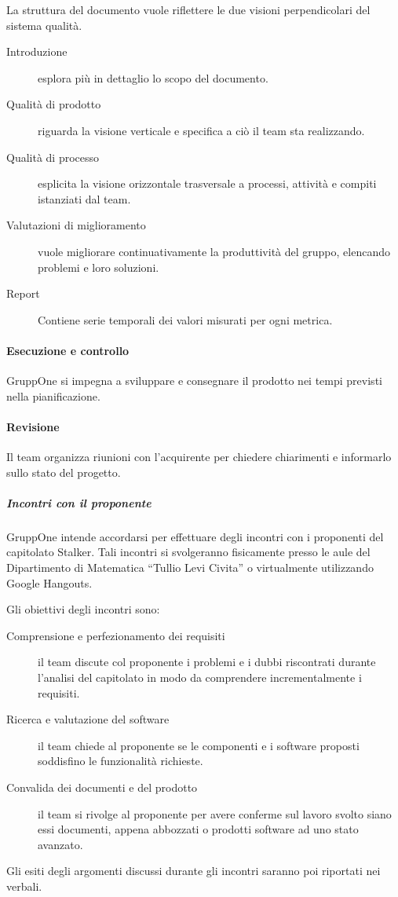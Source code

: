 \documentclass[../../norme-di-progetto.tex]{subfiles}
\begin{document}
La struttura del documento vuole riflettere le due visioni perpendicolari del sistema qualità.

\begin{description}
  \item [Introduzione] esplora più in dettaglio lo scopo del documento.
  \item [Qualità di prodotto] riguarda la visione verticale e specifica a ciò il team sta realizzando.
  \item [Qualità di processo] esplicita la visione orizzontale trasversale a processi, attività e compiti istanziati dal team.
  \item [Valutazioni di miglioramento] vuole migliorare continuativamente la produttività del gruppo, elencando problemi e loro soluzioni.
  \item [Report] Contiene serie temporali dei valori misurati per ogni metrica.
\end{description}

\paragraph{Esecuzione e controllo}%
\label{par:esecuzione e controllo}

GruppOne si impegna a sviluppare e consegnare il prodotto nei tempi previsti nella pianificazione.

\paragraph{Revisione}%
\label{par:fornitura/revisione}

Il team organizza riunioni con l'acquirente per chiedere chiarimenti e informarlo sullo stato del progetto.

\subparagraph{Incontri con il proponente}%
\label{subp:incontri_con_il_proponente}

GruppOne intende accordarsi per effettuare degli incontri con i proponenti del capitolato Stalker.
Tali incontri si svolgeranno fisicamente presso le aule del Dipartimento di Matematica ``Tullio Levi Civita'' o virtualmente utilizzando Google Hangouts.

Gli obiettivi degli incontri sono:
\begin{description}
  \item [Comprensione e perfezionamento dei requisiti] il team discute col proponente i problemi e i dubbi riscontrati durante l'analisi del capitolato in modo da comprendere incrementalmente i requisiti.
  \item [Ricerca e valutazione del software] il team chiede al proponente se le componenti e i software proposti soddisfino le funzionalità richieste.
  \item [Convalida dei documenti e del prodotto] il team si rivolge al proponente per avere conferme sul lavoro svolto siano essi documenti,  appena abbozzati o prodotti software ad uno stato avanzato.
\end{description}
Gli esiti degli argomenti discussi durante gli incontri saranno poi riportati nei verbali.
\end{document}
